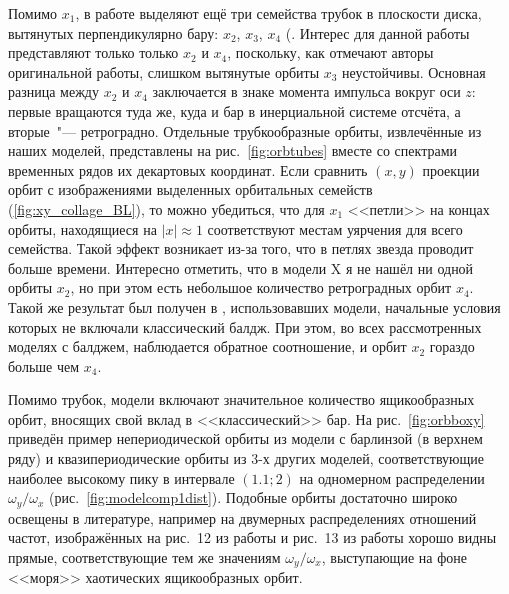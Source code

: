 \documentclass[tikz]{trlnotes}
\begin{document}
Помимо $x_1$, в работе \citet{contopoulos1980a} выделяют ещё три семейства трубок в плоскости диска, вытянутых перпендикулярно бару: $x_2$, $x_3$, $x_4$ (\cite[стр.~185]{2008gady.book.....B}. Интерес для данной работы представляют только только $x_2$ и $x_4$, поскольку, как отмечают авторы оригинальной работы, слишком вытянутые орбиты $x_3$ неустойчивы. Основная разница между $x_2$ и $x_4$ заключается в знаке момента импульса вокруг оси $z$: первые
вращаются туда же, куда и бар в инерциальной системе отсчёта, а вторые~"--- ретроградно. Отдельные трубкообразные орбиты,
извлечённые из наших моделей, представлены на рис.~\ref{fig:orbtubes} вместе со спектрами временных рядов их декартовых координат. 
Если сравнить $(x,y)$ проекции орбит с изображениями выделенных орбитальных семейств (\ref{fig:xy_collage_BL}), то можно убедиться, что для $x_1$ <<петли>> на концах орбиты, находящиеся на $|x|\approx 1$ соответствуют местам уярчения для всего семейства. Такой эффект возникает из-за того, что в петлях звезда проводит больше времени.
Интересно отметить, что в модели X я не нашёл ни одной орбиты $x_2$, но при этом есть небольшое количество ретроградных орбит $x_4$. Такой же результат был получен в \citet{valluri2016,voglis2007}, использовавших модели, начальные условия которых не включали классический балдж. При этом, во всех рассмотренных моделях с балджем, наблюдается обратное соотношение, и орбит $x_2$ гораздо больше чем $x_4$.

Помимо трубок, модели включают значительное количество ящикообразных орбит, вносящих свой вклад в <<классический>> бар. На рис.~\ref{fig:orbboxy} приведён пример непериодической орбиты из модели с барлинзой (в верхнем ряду) и квазипериодические орбиты из 3-х других моделей, соответствующие наиболее высокому пику в интервале $(1.1;2)$ на одномерном распределении $ω_y/ω_x$ (рис.~\ref{fig:modelcomp1dist}).
Подобные орбиты достаточно широко освещены в литературе, например на двумерных распределениях отношений частот, изображённых
на рис.~12 из работы \citet{gajda2016} и рис.~13 из работы \citet{valluri2016} хорошо видны прямые, соответствующие тем же
значениям $ω_y/ω_x$, выступающие на фоне <<моря>> хаотических  ящикообразных орбит.
\end{document}
